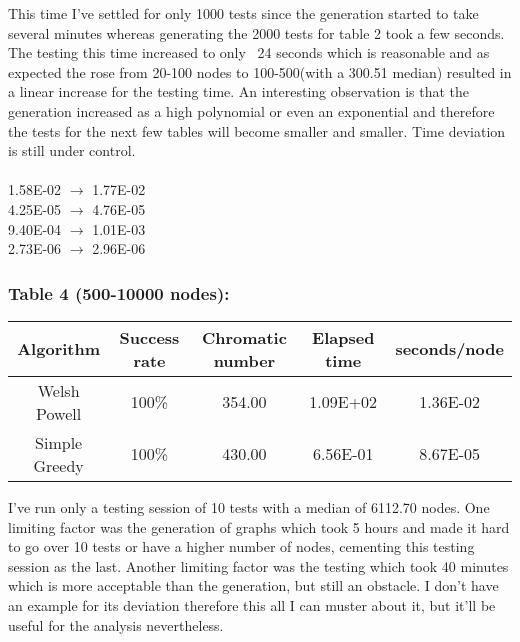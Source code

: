 \documentclass[runningheads]{llncs}
\begin{document}
This time I've settled for only 1000 tests since the generation started to take several
minutes whereas generating the 2000 tests for table 2 took a few seconds. The testing
this time increased to only ~24 seconds which is reasonable and as expected the
rose from 20-100 nodes to 100-500(with a 300.51 median) resulted in a linear increase for the testing time.
An interesting observation is that the generation increased as a high polynomial or even
an exponential and
therefore the tests for the next few tables will become smaller and smaller. Time
deviation is still under control.
\\
\\
\textbullet \hspace{1pt} 1.58E-02 $\rightarrow$ 1.77E-02 \\
\textbullet \hspace{1pt} 4.25E-05 $\rightarrow$ 4.76E-05 \\
\textbullet \hspace{1pt} 9.40E-04 $\rightarrow$ 1.01E-03 \\
\textbullet \hspace{1pt} 2.73E-06 $\rightarrow$	 2.96E-06 \\

\subsubsection{Table 4 (500-10000 nodes):}
\begin{center}
	\begin{tabular}{ |c|c|c|c|c| } 
		\hline
		Algorithm & Success rate & Chromatic number & Elapsed time & seconds/node \\
		\hline
		Welsh Powell & 100\% & 354.00 & 1.09E+02 & 1.36E-02 \\
		Simple Greedy & 100\% & 430.00 & 6.56E-01 & 8.67E-05 \\
		\hline
	\end{tabular}
\end{center}

I've run only a testing session of 10 tests with a median of 6112.70 nodes.
One limiting factor was the generation of graphs which took 5 hours and made it
hard to go over 10 tests or have a higher number of nodes, cementing this testing session as the last. Another limiting factor was the testing which took 40 minutes which
is more acceptable than the generation, but still an obstacle. I don't have an example
for its deviation therefore this all I can muster about it, but it'll be useful for the analysis nevertheless.
\end{document}

